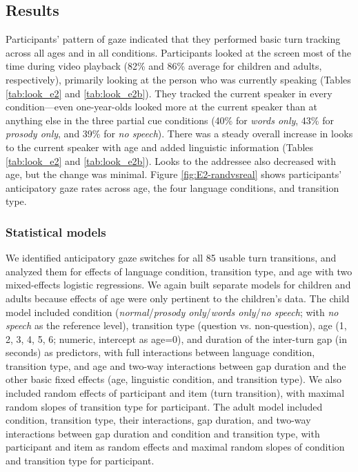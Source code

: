 \documentclass[authoryear, 12pt]{elsarticle}
\begin{document}
\subsection*{Results}
\label{sec:results2}

Participants' pattern of gaze indicated that they performed basic turn tracking across all ages and in all conditions. Participants looked at the screen most of the time during video playback (82\% and 86\% average for children and adults, respectively), primarily looking at the person who was currently speaking (Tables \ref{tab:look_e2} and \ref{tab:look_e2b}). They tracked the current speaker in every condition---even one-year-olds looked more at the current speaker than at anything else in the three partial cue conditions (40\% for \textit{words only}, 43\% for \textit{prosody only}, and 39\% for \textit{no speech}). There was a steady overall increase in looks to the current speaker with age and added linguistic information (Tables \ref{tab:look_e2} and \ref{tab:look_e2b}). Looks to the addressee also decreased with age, but the change was minimal. Figure \ref{fig:E2-randvsreal} shows participants' anticipatory gaze rates across age, the four language conditions, and transition type.

\subsubsection*{Statistical models}
\label{sec:models2}

We identified anticipatory gaze switches for all 85 usable turn transitions, and analyzed them for effects of language condition, transition type, and age with two mixed-effects logistic regressions. We again built separate models for children and adults because effects of age were only pertinent to the children's data. The child model included condition (\textit{normal}/\textit{prosody only}/\textit{words only}/\textit{no speech}; with \textit{no speech} as the reference level), transition type (question vs. non-question), age (1, 2, 3, 4, 5, 6; numeric, intercept as age=0), and duration of the inter-turn gap (in seconds) as predictors, with full interactions between language condition, transition type, and age and two-way interactions between gap duration and the other basic fixed effects (age, linguistic condition, and transition type).  We also included random effects of participant and item (turn transition), with maximal random slopes of transition type for participant. The adult model included condition, transition type, their interactions, gap duration, and two-way interactions between gap duration and condition and transition type, with participant and item as random effects and maximal random slopes of condition and transition type for participant.
\end{document}
